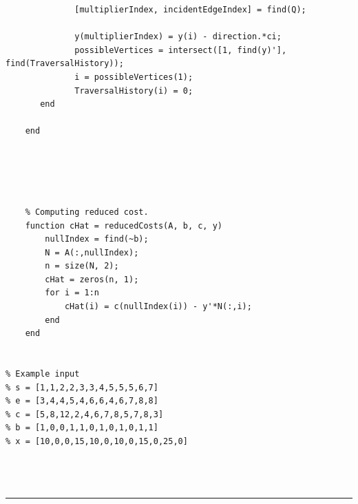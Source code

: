 \documentclass[12pt]{amsart}
\begin{document}
\begin{verbatim}
              [multiplierIndex, incidentEdgeIndex] = find(Q);
              
              y(multiplierIndex) = y(i) - direction.*ci;
              possibleVertices = intersect([1, find(y)'], find(TraversalHistory));
              i = possibleVertices(1);
              TraversalHistory(i) = 0;
       end
       
    end
    
    
    
    
    
    % Computing reduced cost. 
    function cHat = reducedCosts(A, b, c, y)
        nullIndex = find(~b);
        N = A(:,nullIndex);
        n = size(N, 2);
        cHat = zeros(n, 1);
        for i = 1:n
            cHat(i) = c(nullIndex(i)) - y'*N(:,i); 
        end
    end
    

% Example input
% s = [1,1,2,2,3,3,4,5,5,5,6,7]
% e = [3,4,4,5,4,6,6,4,6,7,8,8]
% c = [5,8,12,2,4,6,7,8,5,7,8,3]
% b = [1,0,0,1,1,0,1,0,1,0,1,1]
% x = [10,0,0,15,10,0,10,0,15,0,25,0]




\end{verbatim}
\hrule
\bigskip
\end{document}
